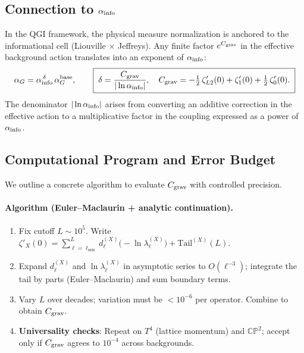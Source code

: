 \documentclass{article}
\numberwithin{equation}{section}
\theoremstyle{plain}
\theoremstyle{definition}
\theoremstyle{remark}
\begin{document}
\subsection{Connection to $\alpha_{\rm info}$}
In the QGI framework, the physical measure normalization is anchored to the informational cell (Liouville $\times$ Jeffreys). Any finite factor $e^{C_{\rm grav}}$ in the effective background action translates into an exponent of $\alpha_{\rm info}$:
\begin{equation}
\alpha_G
= \alpha_{\rm info}^{\,\delta}\,\alpha_G^{\rm base},
\qquad
\boxed{\;
\delta = \frac{C_{\rm grav}}{|\ln \alpha_{\rm info}|},
\quad
C_{\rm grav}
= -\tfrac{1}{2}\,\zeta'_{L2}(0)+\zeta'_1(0)+\tfrac{1}{2}\,\zeta'_0(0).
\;}
\label{eq:delta_from_zeta}
\end{equation}
The denominator $|\ln\alpha_{\rm info}|$ arises from converting an additive correction in the effective action to a multiplicative factor in the coupling expressed as a power of $\alpha_{\rm info}$.

\subsection{Computational Program and Error Budget}
\label{subsec:delta_algorithm}

\noindent
We outline a concrete algorithm to evaluate $C_{\rm grav}$ with controlled precision.

\paragraph{Algorithm (Euler–Maclaurin + analytic continuation).}
\begin{enumerate}
\item Fix cutoff $L\sim 10^5$. Write $\zeta'_X(0)=\sum_{\ell=\ell_{\min}}^{L} d_\ell^{(X)}\big(-\ln\lambda^{(X)}_\ell\big)+\mathrm{Tail}^{(X)}(L)$.
\item Expand $d_\ell^{(X)}$ and $\ln\lambda^{(X)}_\ell$ in asymptotic series to $O(\ell^{-3})$; integrate the tail by parts (Euler–Maclaurin) and sum boundary terms.
\item Vary $L$ over decades; variation must be $<10^{-6}$ per operator. Combine to obtain $C_{\rm grav}$.
\item \textbf{Universality checks}: Repeat on $T^4$ (lattice momentum) and $\mathbb{CP}^2$; accept only if $C_{\rm grav}$ agrees to $10^{-4}$ across backgrounds.
\end{enumerate}
\end{document}
